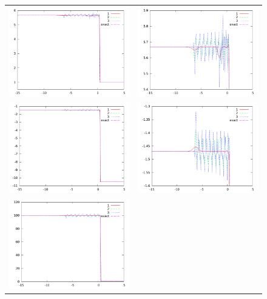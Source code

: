 \documentclass[10pt]{article}
\begin{document}
\begin{figure}[h]
  \begin{center}
	\begin{tabular}{cc}
      \includegraphics[width=.4\textwidth]{den_T11.png} &
	  \includegraphics[width=.4\textwidth]{den11zoom.png} \\
	  \includegraphics[width=.4\textwidth]{vel_T11.png} &	
	  \includegraphics[width=.4\textwidth]{vel11zoom.png} \\
      \includegraphics[width=.4\textwidth]{prs_T11.png} &	

\end{tabular}
\end{center}
\end{figure}
\end{document}
